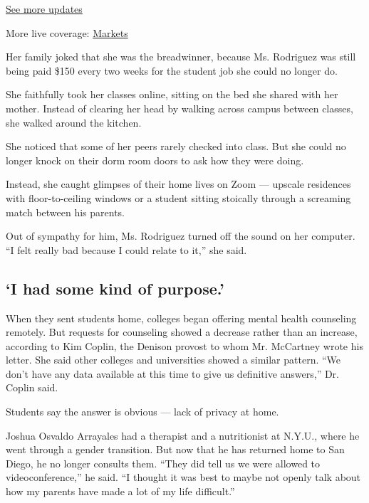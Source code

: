 \href{https://www.nytimes.com/2020/08/01/world/coronavirus-covid-19.html?action=click\&pgtype=Article\&state=default\&region=MAIN_CONTENT_1\&context=storylines_live_updates}{See
more updates}

More live coverage:
\href{https://www.nytimes.com/live/2020/07/31/business/stock-market-today-coronavirus?action=click\&pgtype=Article\&state=default\&region=MAIN_CONTENT_1\&context=storylines_live_updates}{Markets}

Her family joked that she was the breadwinner, because Ms. Rodriguez was
still being paid \$150 every two weeks for the student job she could no
longer do.

She faithfully took her classes online, sitting on the bed she shared
with her mother. Instead of clearing her head by walking across campus
between classes, she walked around the kitchen.

She noticed that some of her peers rarely checked into class. But she
could no longer knock on their dorm room doors to ask how they were
doing.

Instead, she caught glimpses of their home lives on Zoom --- upscale
residences with floor-to-ceiling windows or a student sitting stoically
through a screaming match between his parents.

Out of sympathy for him, Ms. Rodriguez turned off the sound on her
computer. ``I felt really bad because I could relate to it,'' she said.

\hypertarget{i-had-some-kind-of-purpose}{%
\subsection{`I had some kind of
purpose.'}\label{i-had-some-kind-of-purpose}}

When they sent students home, colleges began offering mental health
counseling remotely. But requests for counseling showed a decrease
rather than an increase, according to Kim Coplin, the Denison provost to
whom Mr. McCartney wrote his letter. She said other colleges and
universities showed a similar pattern. ``We don't have any data
available at this time to give us definitive answers,'' Dr. Coplin said.

Students say the answer is obvious --- lack of privacy at home.

Joshua Osvaldo Arrayales had a therapist and a nutritionist at N.Y.U.,
where he went through a gender transition. But now that he has returned
home to San Diego, he no longer consults them. ``They did tell us we
were allowed to videoconference,'' he said. ``I thought it was best to
maybe not openly talk about how my parents have made a lot of my life
difficult.''

